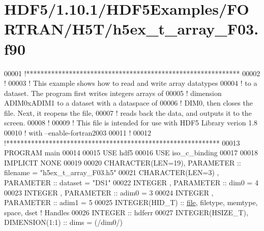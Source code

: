 \hypertarget{_h_d_f5_21_810_81_2_h_d_f5_examples_2_f_o_r_t_r_a_n_2_h5_t_2h5ex__t__array___f03_8f90_source}{}\section{H\+D\+F5/1.10.1/\+H\+D\+F5\+Examples/\+F\+O\+R\+T\+R\+A\+N/\+H5\+T/h5ex\+\_\+t\+\_\+array\+\_\+\+F03.f90}
\label{_h_d_f5_21_810_81_2_h_d_f5_examples_2_f_o_r_t_r_a_n_2_h5_t_2h5ex__t__array___f03_8f90_source}

\begin{DoxyCode}
00001 \textcolor{comment}{!************************************************************}
00002 \textcolor{comment}{!}
00003 \textcolor{comment}{!  This example shows how to read and write array datatypes}
00004 \textcolor{comment}{!  to a dataset.  The program first writes integers arrays of}
00005 \textcolor{comment}{!  dimension ADIM0xADIM1 to a dataset with a dataspace of}
00006 \textcolor{comment}{!  DIM0, then closes the  file.  Next, it reopens the file,}
00007 \textcolor{comment}{!  reads back the data, and outputs it to the screen.}
00008 \textcolor{comment}{!}
00009 \textcolor{comment}{!  This file is intended for use with HDF5 Library verion 1.8}
00010 \textcolor{comment}{!  with --enable-fortran2003 }
00011 \textcolor{comment}{!}
00012 \textcolor{comment}{!************************************************************}
00013 \textcolor{keyword}{PROGRAM} main
00014 
00015   \textcolor{keywordtype}{USE }hdf5
00016   \textcolor{keywordtype}{USE }iso\_c\_binding
00017   
00018   \textcolor{keywordtype}{IMPLICIT NONE}
00019 
00020   \textcolor{keywordtype}{CHARACTER(LEN=19)}, \textcolor{keywordtype}{PARAMETER} :: filename  = \textcolor{stringliteral}{"h5ex\_t\_array\_F03.h5"}
00021   \textcolor{keywordtype}{CHARACTER(LEN=3)} , \textcolor{keywordtype}{PARAMETER} :: dataset   = \textcolor{stringliteral}{"DS1"}
00022   \textcolor{keywordtype}{INTEGER}          , \textcolor{keywordtype}{PARAMETER} :: dim0      = 4
00023   \textcolor{keywordtype}{INTEGER}          , \textcolor{keywordtype}{PARAMETER} :: adim0     = 3
00024   \textcolor{keywordtype}{INTEGER}          , \textcolor{keywordtype}{PARAMETER} :: adim1     = 5
00025   \textcolor{keywordtype}{INTEGER(HID\_T)}  :: \hyperlink{structfile}{file}, filetype, memtype, space, dset \textcolor{comment}{! Handles}
00026   \textcolor{keywordtype}{INTEGER} :: hdferr
00027   \textcolor{keywordtype}{INTEGER(HSIZE\_T)}, \textcolor{keywordtype}{DIMENSION(1:1)}   :: dims = (/dim0/)

\end{DoxyCode}

